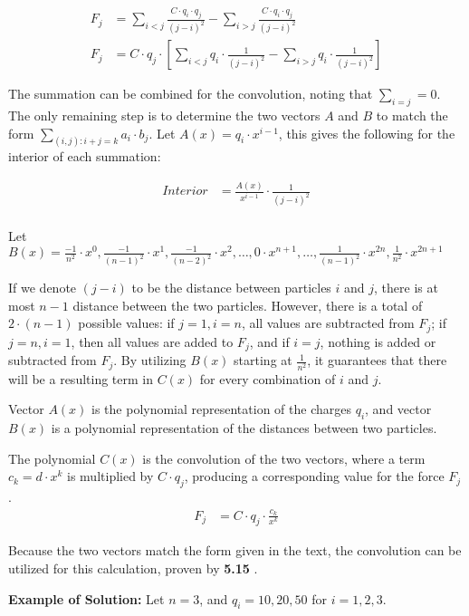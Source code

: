 \documentclass{article}
\begin{document}
\begin{align*}
F_j &= \sum_{i < j}^{} \frac{C \cdot q_i \cdot q_j}{(j - i)^2} - \sum_{i > j}^{} \frac{C \cdot q_i \cdot q_j}{(j-i)^2} \\
F_j &= C \cdot q_j \cdot [ \sum_{i < j}^{} q_i \cdot \frac{1}{(j - i)^2} - \sum_{i > j}^{} q_i \cdot \frac{1}{(j-i)^2} ]
\end{align*}

The summation can be combined for the convolution, noting that $\sum_{i = j} = 0$.  
The only remaining step is to determine the two vectors $A$ and $B$ to match the form $\sum_{(i,j):i+j=k} a_i \cdot b_j$.
Let $A(x) = q_i \cdot x^{i-1}$, this gives the following for the interior of each summation:

\begin{align*}
Interior &= \frac{A(x)}{x^{i-1}} \cdot \frac{1}{(j-i)^2} \\
\end{align*}

Let $B(x) = \frac{-1}{n^2} \cdot x^0, \frac{-1}{(n-1)^2} \cdot x^1, \frac{-1}{(n-2)^2} \cdot x^2, \dots, 0 \cdot x^{n+1}, \dots, \frac{1}{(n-1)^2} \cdot x^{2n}, \frac{1}{n^2} \cdot x^{2n + 1}$

\noindent If we denote $(j - i)$ to be the distance between particles $i$ and $j$, there is at most $n-1$ distance between the two particles.  However, there is a total of $2 \cdot (n - 1)$ possible values: if $j=1, i=n$, all values are subtracted from $F_j$; if $j=n, i = 1$, then all values are added to $F_j$, and if $i = j$, nothing is added or subtracted from $F_j$.  By utilizing $B(x)$ starting at $\frac{1}{n^2}$, it guarantees that there will be a resulting term in $C(x)$ for every combination of $i$ and $j$.

\noindent Vector $A(x)$ is the polynomial representation of the charges $q_i$, and vector $B(x)$ is a polynomial representation of the distances between two particles.  

The polynomial $C(x)$ is the convolution of the two vectors, where a term $c_k = d \cdot x^k$ is multiplied by $C \cdot q_j$, producing a corresponding value for the force $F_j$.  
\begin{align*}
F_j &= C \cdot q_j \cdot \frac{c_k}{x^k}
\end{align*}

Because the two vectors match the form given in the text, the convolution can be utilized for this calculation, proven by \textbf{5.15} \cite{algDesign}.

\noindent \textbf{Example of Solution:}
Let $n = 3$, and $q_i = 10, 20, 50$ for $i = 1, 2, 3$.  
\end{document}
